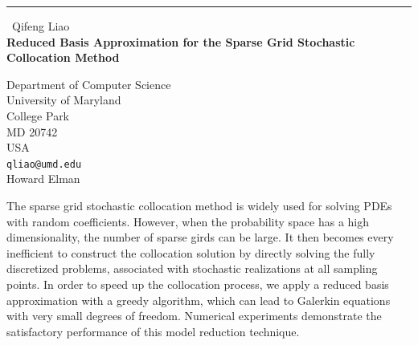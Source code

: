 \documentclass{report}
\begin{document}
\begin{center}
\rule{6in}{1pt} \
{\large Qifeng Liao \\
{\bf Reduced Basis Approximation for the Sparse Grid Stochastic Collocation Method}}

Department of Computer Science \\ University of Maryland \\ College Park \\ MD 20742 \\ USA
\\
{\tt qliao@umd.edu}\\
Howard Elman \end{center}

The sparse grid stochastic collocation method is widely used for solving
PDEs with random coefficients. However, when the probability space has a
high dimensionality, the number of sparse girds can be large. It then
becomes every inefficient to construct the collocation solution by
directly solving the fully discretized problems, associated with
stochastic realizations at all sampling points. In order to speed up the
collocation process, we apply a reduced basis approximation with a greedy
algorithm, which can lead to Galerkin equations with very small degrees
of freedom. Numerical experiments demonstrate the satisfactory
performance of this model reduction technique.
\end{document}
